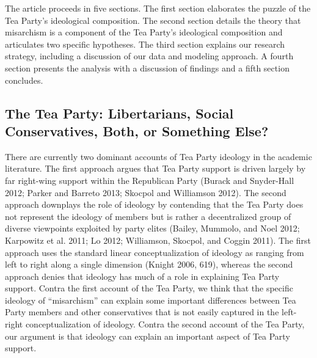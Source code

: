 \documentclass[12pt,]{article}
\begin{document}
The article proceeds in five sections. The first section elaborates the
puzzle of the Tea Party's ideological composition. The second section
details the theory that misarchism is a component of the Tea Party's
ideological composition and articulates two specific hypotheses. The
third section explains our research strategy, including a discussion of
our data and modeling approach. A fourth section presents the analysis
with a discussion of findings and a fifth section concludes.

\subsection{The Tea Party: Libertarians, Social Conservatives, Both, or
Something
Else?}\label{the-tea-party-libertarians-social-conservatives-both-or-something-else}

There are currently two dominant accounts of Tea Party ideology in the
academic literature. The first approach argues that Tea Party support is
driven largely by far right-wing support within the Republican Party
(Burack and Snyder-Hall 2012; Parker and Barreto 2013; Skocpol and
Williamson 2012). The second approach downplays the role of ideology by
contending that the Tea Party does not represent the ideology of members
but is rather a decentralized group of diverse viewpoints exploited by
party elites (Bailey, Mummolo, and Noel 2012; Karpowitz et al. 2011; Lo
2012; Williamson, Skocpol, and Coggin 2011). The first approach uses the
standard linear conceptualization of ideology as ranging from left to
right along a single dimension (Knight 2006, 619), whereas the second
approach denies that ideology has much of a role in explaining Tea Party
support. Contra the first account of the Tea Party, we think that the
specific ideology of ``misarchism'' can explain some important
differences between Tea Party members and other conservatives that is
not easily captured in the left-right conceptualization of ideology.
Contra the second account of the Tea Party, our argument is that
ideology can explain an important aspect of Tea Party support.
\end{document}
